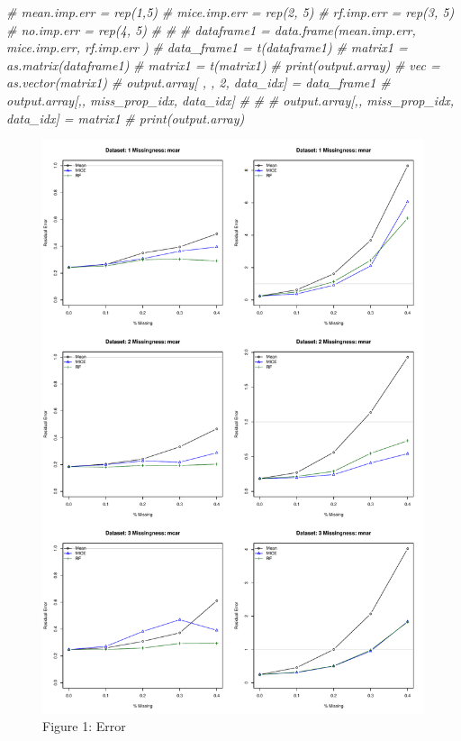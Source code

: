 \documentclass[]{article}
\newenvironment{Shaded}{\begin{snugshade}}{\end{snugshade}}
\newcommand{\CommentTok}[1]{\textcolor[rgb]{0.56,0.35,0.01}{\textit{#1}}}
\begin{document}
\begin{Shaded}
\begin{Highlighting}[]
\CommentTok{# mean.imp.err = rep(1,5)}
\CommentTok{# mice.imp.err = rep(2, 5)}
\CommentTok{# rf.imp.err = rep(3, 5)}
\CommentTok{# no.imp.err = rep(4, 5)}
\CommentTok{# }
\CommentTok{# }
\CommentTok{# dataframe1 = data.frame(mean.imp.err, mice.imp.err, rf.imp.err )}
\CommentTok{# data_frame1 = t(dataframe1)}
\CommentTok{# matrix1 = as.matrix(dataframe1)}
\CommentTok{# matrix1 = t(matrix1)}
\CommentTok{# print(output.array)}
\CommentTok{# vec = as.vector(matrix1)}
\CommentTok{# output.array[ , , 2, data_idx] = data_frame1}
\CommentTok{# output.array[,, miss_prop_idx, data_idx]}
\CommentTok{# }
\CommentTok{# }
\CommentTok{# output.array[,, miss_prop_idx, data_idx] = matrix1}
\CommentTok{# print(output.array)}
\end{Highlighting}
\end{Shaded}

\begin{figure}
\centering
\includegraphics{error_plot_dataset.pdf}
\caption{Figure 1: Error}
\end{figure}
\end{document}
